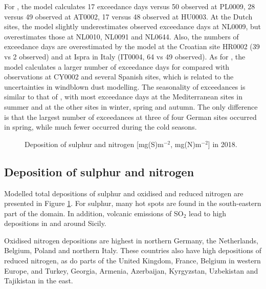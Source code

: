For \PM[2.5], the model calculates 17 exceedance days versus 50 observed at PL0009, 28 versus 49 observed at AT0002, 17 versus 48 observed at HU0003. At the Dutch sites, the model slightly underestimates observed \PM[2.5] exceedance days at NL0009, but overestimates those at NL0010, NL0091 and NL0644. Also, the numbers of exceedance days are overestimated by the model at the Croatian site HR0002 (39 vs 2 observed) and at Ispra in Italy (IT0004, 64 vs 49 observed). As for \PM[10], the model calculates a larger number of exceedance days for \PM[2.5] compared with observations at CY0002 and several Spanish sites, which is related to the uncertainties in windblown dust modelling. The seasonality of \PM[2.5] exceedances is similar to that of \PM[10], with most exceedance days at the Mediterranean sites in summer and at the other sites in winter, spring and autumn. The only difference is that the largest number of \PM[2.5] exceedances at three of four German sites occurred in spring, while much fewer occurred during the cold seasons.

\begin{figure}[H]
  \centering
 \caption{Deposition of sulphur and nitrogen [mg(S)m$^{-2}$, mg(N)m$^{-2}$] in 2018.}
\label{deps}
\end{figure}


\subsection{Deposition of sulphur and nitrogen} %
\label{subs:dep}

Modelled total depositions of sulphur and oxidised and reduced nitrogen are presented in Figure \ref{deps}.
For sulphur, many hot spots are found in the south-eastern part of the domain. In addition, volcanic emissions of SO$_2$ lead to high depositions in and around Sicily.

Oxidised nitrogen depositions are highest in northern Germany, the Netherlands, Belgium, Poland and northern Italy. These countries also have high depositions of reduced nitrogen, as do parts of the United Kingdom, France, Belgium in western Europe, and Turkey, Georgia, Armenia, Azerbaijan, Kyrgyzstan, Uzbekistan and Tajikistan in the east. 

